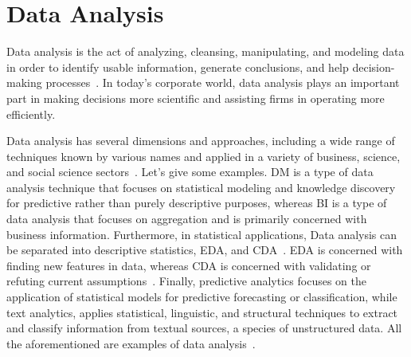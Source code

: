 \section{Data Analysis}\label{section:data_anal}
Data analysis is the act of analyzing, cleansing, manipulating, and modeling data in order to identify usable information, generate conclusions, and help decision-making processes~\cite{Book:sbrown_2014_transforming}.
In today's corporate world, data analysis plays an important part in making decisions more scientific and assisting firms in operating more efficiently. 

Data analysis has several dimensions and approaches, including a wide range of techniques known by various names and applied in a variety of business, science, and social science sectors~\cite{Book:pruneau_2017}.
Let's give some examples.
\ac{DM} is a type of data analysis technique that focuses on statistical modeling and knowledge discovery for predictive rather than purely descriptive purposes,
whereas \ac{BI} is a type of data analysis that focuses on aggregation and is primarily concerned with business information.
Furthermore, in statistical applications, Data analysis can be separated into descriptive statistics, \ac{EDA}, and \ac{CDA}~\cite{Book:doing_data_science}. 
\ac{EDA} is concerned with finding new features in data, whereas \ac{CDA} is concerned with validating or refuting current assumptions~\cite{Article:intro_to_data_analysis}.
Finally, predictive analytics focuses on the application of statistical models for predictive forecasting or classification,
while text analytics, applies statistical, linguistic, and structural techniques to extract and classify information from textual sources, a species of unstructured data.
All the aforementioned are examples of data analysis~\cite{Article:goodnight_2011_the}.

